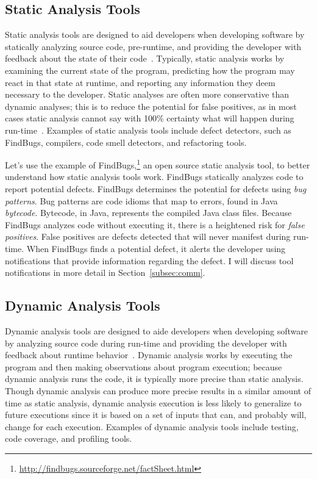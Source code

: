 \subsection{Static Analysis Tools}

Static analysis tools are designed to aid developers when developing software by statically analyzing source code, pre-runtime, and providing the developer with feedback about the state of their code~\cite{ernst2003static}.
Typically, static analysis works by examining the current state of the program, predicting how the program may react in that state at runtime, and reporting any information they deem necessary to the developer. Static analyses are often more conservative than dynamic analyses; this is to reduce the potential for false positives, as in most cases static analysis cannot say with 100\% certainty what will happen during run-time~\cite{ernst2003static}. 
Examples of static analysis tools include defect detectors, such as FindBugs, compilers, code smell detectors, and refactoring tools.

Let's use the example of FindBugs,\footnote{\url{http://findbugs.sourceforge.net/factSheet.html}} an open source static analysis tool, to better understand how static analysis tools work. FindBugs statically analyzes code to report potential defects. FindBugs determines the potential for defects using \emph{bug patterns}. Bug patterns are code idioms that map to errors, found in Java \emph{bytecode}. Bytecode, in Java, represents the compiled Java class files. Because FindBugs analyzes code without executing it, there is a heightened risk for \emph{false positives}. False positives are defects detected that will never manifest during run-time. When FindBugs finds a potential defect, it alerts the developer using notifications that provide information regarding the defect. I will discuss tool notifications in more detail in Section~\ref{subsec:comm}.


\subsection{Dynamic Analysis Tools}

Dynamic analysis tools are designed to aide developers when developing software by analyzing source code during run-time and providing the developer with feedback about runtime behavior~\cite{ernst2003static}.
Dynamic analysis works by executing the program and then making observations about program execution; because dynamic analysis runs the code, it is typically more precise than static analysis. Though dynamic analysis can produce more precise results in a similar amount of time as static analysis, dynamic analysis execution is less likely to generalize to future executions since it is based on a set of inputs that can, and probably will, change for each execution.
Examples of dynamic analysis tools include testing, code coverage, and profiling tools.

